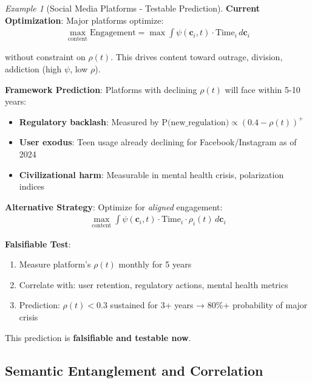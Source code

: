 \documentclass[11pt,a4paper]{article}
\theoremstyle{definition}
\theoremstyle{remark}
\newtheorem{example}{Example}[section]
\newcommand{\cc}{\mathbf{c}}
\begin{document}
\begin{example}[Social Media Platforms - Testable Prediction]
\textbf{Current Optimization}: Major platforms optimize:
\begin{align}
\max_{\text{content}} \text{Engagement} = \max \int \psi(\cc_i, t) \cdot \text{Time}_i \, d\cc_i
\end{align}

without constraint on \(\rho(t)\). This drives content toward outrage, division, addiction (high \(\psi\), low \(\rho\)).

\textbf{Framework Prediction}: Platforms with declining \(\rho(t)\) will face within 5-10 years:
\begin{itemize}
\item \textbf{Regulatory backlash}: Measured by \(\text{P(new\_regulation)} \propto (0.4 - \rho(t))^+\)
\item \textbf{User exodus}: Teen usage already declining for Facebook/Instagram as of 2024
\item \textbf{Civilizational harm}: Measurable in mental health crisis, polarization indices
\end{itemize}

\textbf{Alternative Strategy}: Optimize for \textit{aligned} engagement:
\begin{align}
\max_{\text{content}} \int \psi(\cc_i, t) \cdot \text{Time}_i \cdot \rho_i(t) \, d\cc_i
\end{align}

\textbf{Falsifiable Test}: 
\begin{enumerate}
    \item Measure platform's \(\rho(t)\) monthly for 5 years
    \item Correlate with: user retention, regulatory actions, mental health metrics
    \item Prediction: \(\rho(t) < 0.3\) sustained for 3+ years → 80\%+ probability of major crisis
\end{enumerate}

This prediction is \textbf{falsifiable and testable now}.
\end{example}

\subsection{Semantic Entanglement and Correlation}
\end{document}
